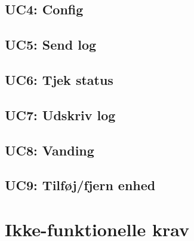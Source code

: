 
%


\subsection{UC4: Config}



\subsection{UC5: Send log}



\subsection{UC6: Tjek status}



\subsection{UC7: Udskriv log}



\subsection{UC8: Vanding}



\subsection{UC9: Tilføj/fjern enhed}



%


\section{Ikke-funktionelle krav}
